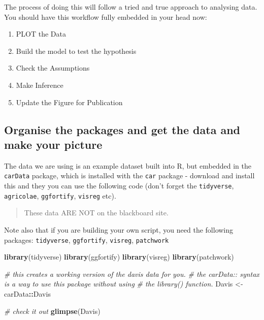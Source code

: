 \documentclass[
]{book}
\newenvironment{Shaded}{\begin{snugshade}}{\end{snugshade}}
\newcommand{\CommentTok}[1]{\textcolor[rgb]{0.56,0.35,0.01}{\textit{#1}}}
\newcommand{\FunctionTok}[1]{\textcolor[rgb]{0.13,0.29,0.53}{\textbf{#1}}}
\newcommand{\NormalTok}[1]{#1}
\newcommand{\OtherTok}[1]{\textcolor[rgb]{0.56,0.35,0.01}{#1}}
\newcommand{\SpecialCharTok}[1]{\textcolor[rgb]{0.81,0.36,0.00}{\textbf{#1}}}
\providecommand{\tightlist}{%
  \setlength{\itemsep}{0pt}\setlength{\parskip}{0pt}}
\begin{document}
The process of doing this will follow a tried and true approach to analysing data. You should have this workflow fully embedded in your head now:

\begin{enumerate}
\def\labelenumi{\arabic{enumi})}
\tightlist
\item
  PLOT the Data
\item
  Build the model to test the hypothesis
\item
  Check the Assumptions
\item
  Make Inference
\item
  Update the Figure for Publication
\end{enumerate}

\hypertarget{organise-the-packages-and-get-the-data-and-make-your-picture}{%
\subsection{Organise the packages and get the data and make your picture}\label{organise-the-packages-and-get-the-data-and-make-your-picture}}

The data we are using is an example dataset built into R, but embedded in the \texttt{carData} package, which is installed with the \texttt{car} package - download and install this and they you can use the following code (don't forget the \texttt{tidyverse}, \texttt{agricolae}, \texttt{ggfortify}, \texttt{visreg} etc).

\begin{quote}
These data ARE NOT on the blackboard site.
\end{quote}

Note also that if you are building your own script, you need the following packages: \texttt{tidyverse}, \texttt{ggfortify}, \texttt{visreg}, \texttt{patchwork}

\begin{Shaded}
\begin{Highlighting}[]
\FunctionTok{library}\NormalTok{(tidyverse)}
\FunctionTok{library}\NormalTok{(ggfortify)}
\FunctionTok{library}\NormalTok{(visreg)}
\FunctionTok{library}\NormalTok{(patchwork)}

\CommentTok{\# this creates a working version of the davis data for you.}
\CommentTok{\# the carData:: syntax is a way to use this package without using}
\CommentTok{\# the library() function.}
\NormalTok{Davis }\OtherTok{\textless{}{-}}\NormalTok{ carData}\SpecialCharTok{::}\NormalTok{Davis}

\CommentTok{\# check it out}
\FunctionTok{glimpse}\NormalTok{(Davis)}
\end{Highlighting}
\end{Shaded}
\end{document}
